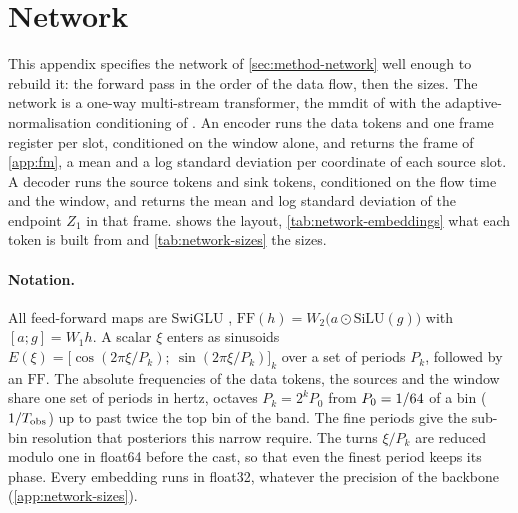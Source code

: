 \section{Network}
\label{app:network}

This appendix specifies the network of \cref{sec:method-network} well enough to rebuild it: the
forward pass in the order of the data flow, then the sizes. The network is a one-way multi-stream
transformer, the \ac{mmdit} of \citet{esser2024scaling} with the adaptive-normalisation
conditioning of \citet{peebles2023scalable}. An encoder runs the data tokens and one frame register
per slot, conditioned on the window alone, and returns the frame of \cref{app:fm}, a mean and a log
standard deviation per coordinate of each source slot. A decoder runs the source tokens and
\NetworkSinksWord{} sink tokens, conditioned on the flow time and the window, and returns the mean
and log standard deviation of the endpoint $Z_1$ in that frame. 
shows the layout, \cref{tab:network-embeddings} what each token is built from and
\cref{tab:network-sizes} the sizes.

\paragraph{Notation.}
All feed-forward maps are SwiGLU \citep{shazeer2020glu}, $\mathrm{FF}(h) =
W_2\bigl(a\odot\mathrm{SiLU}(g)\bigr)$ with $[a;g] = W_1h$. A scalar $\xi$ enters as sinusoids
$E(\xi) = \bigl[\cos(2\pi\xi/P_k);\ \sin(2\pi\xi/P_k)\bigr]_k$ over a set of periods $P_k$,
followed by an $\mathrm{FF}$. The absolute frequencies of the data tokens, the sources and the
window share one set of periods in hertz, octaves $P_k = 2^kP_0$ from $P_0 =
1/64{}$ of a bin ($1/T_{\rm obs}$) up to past twice the top bin of the band. The fine
periods give the sub-bin resolution that posteriors this narrow require. The turns $\xi/P_k$ are
reduced modulo one in float64 before the cast, so that even the finest period keeps its phase.
Every embedding runs in float32, whatever the precision of the backbone
(\cref{app:network-sizes}).

